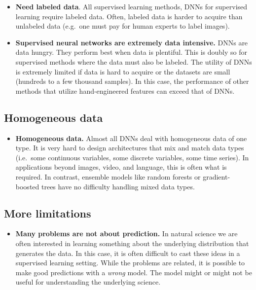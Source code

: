 \documentclass[%
oneside,                 %
final,                   %
10pt]{article}
\begin{document}
\begin{itemize}
\item \textbf{Need labeled data}. All supervised learning methods, DNNs for supervised learning require labeled data. Often, labeled data is harder to acquire than unlabeled data (e.g.~one must pay for human experts to label images).

\item \textbf{Supervised neural networks are extremely data intensive.} DNNs are data hungry. They perform best when data is plentiful. This is doubly so for supervised methods where the data must also be labeled. The utility of DNNs is extremely limited if data is hard to acquire or the datasets are small (hundreds to a few thousand samples). In this case, the performance of other methods that utilize hand-engineered features can exceed that of DNNs.
\end{itemize}

\noindent
\subsection{Homogeneous data}

\begin{itemize}
\item \textbf{Homogeneous data.} Almost all DNNs deal with homogeneous data of one type. It is very hard to design architectures that mix and match data types (i.e.~some continuous variables, some discrete variables, some time series). In applications beyond images, video, and language, this is often what is required. In contrast, ensemble models like random forests or gradient-boosted trees have no difficulty handling mixed data types.
\end{itemize}

\noindent
\subsection{More limitations}

\begin{itemize}
\item \textbf{Many problems are not about prediction.} In natural science we are often interested in learning something about the underlying distribution that generates the data. In this case, it is often difficult to cast these ideas in a supervised learning setting. While the problems are related, it is possible to make good predictions with a \emph{wrong} model. The model might or might not be useful for understanding the underlying science.
\end{itemize}
\end{document}
